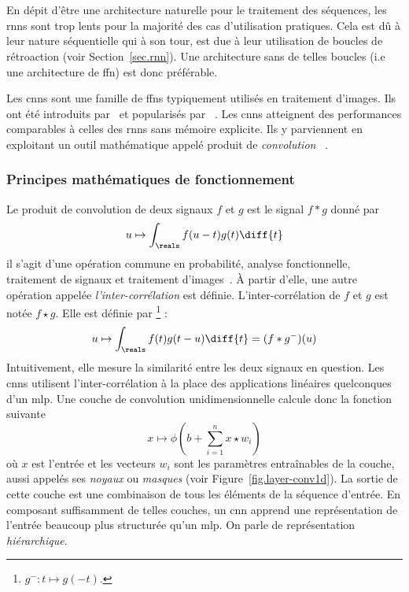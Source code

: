 \section{}
\label{sec.cnn}

En dépit d'être une architecture naturelle pour le traitement des séquences,
les \glspl{rnn} sont trop lents pour la majorité des cas d'utilisation pratiques.
Cela est dû à leur nature séquentielle qui à son tour, 
est due à leur utilisation de boucles de rétroaction (voir Section~\ref{sec.rnn}).
Une architecture sans de telles boucles (i.e une architecture de \gls{ffn}) est donc préférable.

Les \glspl{cnn} sont une famille de \glspl{ffn} typiquement utilisés en traitement d'images.
Ils ont été introduits par~\cite{Fukushima_1980} et popularisés par%
~\cite{LeCun_Boser_Denker_Henderson_Howard_Hubbard_Jackel_1989,Lecun_Bottou_Bengio_Haffner_1998}.
Les \glspl{cnn} atteignent des performances comparables à celles des \glspl{rnn} sans mémoire explicite.
Ils y parviennent en exploitant un outil mathématique appelé produit de \emph{convolution}%
~\cite{Calin_2020}.

\subsubsection{Principes mathématiques de fonctionnement}

Le produit de convolution de deux signaux \(f\) et \(g\) est le signal \(f \ast g\) donné par
\begin{equation}
    \label{eq.convolution}
    u \mapsto \int_\reals f(u-t)g(t)\diff{t}
\end{equation}
il s'agit d'une opération commune en probabilité, analyse fonctionnelle, 
traitement de signaux et traitement d'images~\cite{Barbe_Ledoux_2012,Oppenheim_Schafer_2013}.
À partir d'elle, une autre opération appelée \emph{l'inter-corrélation} est définie.
L'inter-corrélation de \(f\) et \(g\) est notée \(f\star g\).
Elle est définie par%
\footnote{\(g^- : t \mapsto g(-t)\).} :
\begin{equation}
    \label{eq.cros-corr}
    u \mapsto \int_\reals f(t)g(t-u)\diff{t} = (f \ast g^-)(u)
\end{equation}
Intuitivement, elle mesure la similarité entre les deux signaux en question.
Les \glspl{cnn} utilisent l'inter-corrélation à la place des applications linéaires quelconques d'un \gls{mlp}.
Une couche de convolution unidimensionnelle calcule donc la fonction suivante
\begin{equation}
    \label{eq.layer-conv1d}
    x \mapsto \phi\left(b + \sum_{i=1}^n x\star w_i\right)
\end{equation}
où \(x\) est l'entrée et les vecteurs \(w_i\) sont les paramètres entraînables de la couche, 
aussi appelés ses \emph{noyaux} ou \emph{masques}
(voir Figure~\ref{fig.layer-conv1d}).
La sortie de cette couche est une combinaison de tous les éléments de la séquence d'entrée.
En composant suffisamment de telles couches,
un \gls{cnn} apprend une représentation de l'entrée beaucoup plus structurée qu'un \gls{mlp}.
On parle de représentation \emph{hiérarchique}.

